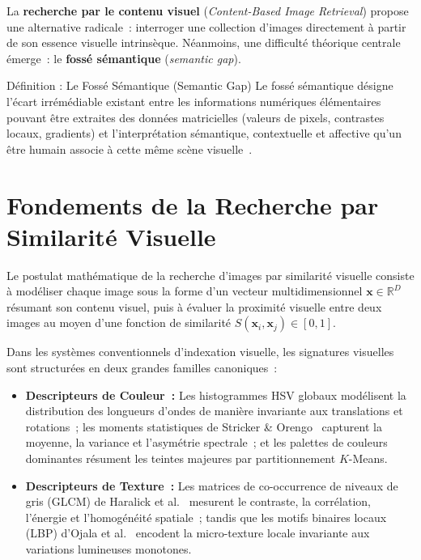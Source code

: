 La \textbf{recherche par le contenu visuel} (\textit{Content-Based Image Retrieval}) propose une alternative radicale~: interroger une collection d'images directement à partir de son essence visuelle intrinsèque. Néanmoins, une difficulté théorique centrale émerge~: le \textbf{fossé sémantique} (\textit{semantic gap}).

\begin{infobox}{Définition : Le Fossé Sémantique (Semantic Gap)}
Le fossé sémantique désigne l'écart irrémédiable existant entre les informations numériques élémentaires pouvant être extraites des données matricielles (valeurs de pixels, contrastes locaux, gradients) et l'interprétation sémantique, contextuelle et affective qu'un être humain associe à cette même scène visuelle~\cite{smeulders2000content}.
\end{infobox}

\section{Fondements de la Recherche par Similarité Visuelle}

Le postulat mathématique de la recherche d'images par similarité visuelle consiste à modéliser chaque image sous la forme d'un vecteur multidimensionnel $\mathbf{x} \in \mathbb{R}^D$ résumant son contenu visuel, puis à évaluer la proximité visuelle entre deux images au moyen d'une fonction de similarité $S(\mathbf{x}_i, \mathbf{x}_j) \in [0, 1]$.

Dans les systèmes conventionnels d'indexation visuelle, les signatures visuelles sont structurées en deux grandes familles canoniques~:
\begin{itemize}
    \item \textbf{Descripteurs de Couleur~:} Les histogrammes HSV globaux modélisent la distribution des longueurs d'ondes de manière invariante aux translations et rotations~; les moments statistiques de Stricker \& Orengo~\cite{stricker1995similarity} capturent la moyenne, la variance et l'asymétrie spectrale~; et les palettes de couleurs dominantes résument les teintes majeures par partitionnement $K$-Means.
    \item \textbf{Descripteurs de Texture~:} Les matrices de co-occurrence de niveaux de gris (GLCM) de Haralick et al.~\cite{haralick1973textural} mesurent le contraste, la corrélation, l'énergie et l'homogénéité spatiale~; tandis que les motifs binaires locaux (LBP) d'Ojala et al.~\cite{ojala2002multiresolution} encodent la micro-texture locale invariante aux variations lumineuses monotones.
\end{itemize}

